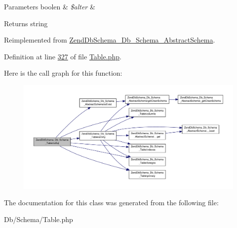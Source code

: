 \begin{DoxyParams}[1]{Parameters}
boolen & {\em \$alter} & \\
\hline
\end{DoxyParams}
\begin{DoxyReturn}{Returns}
string 
\end{DoxyReturn}


Reimplemented from \hyperlink{classZendDbSchema__Db__Schema__AbstractSchema_ada5af8e6e7a4c5407b7ca67d03900b31}{Zend\-Db\-Schema\-\_\-\-Db\-\_\-\-Schema\-\_\-\-Abstract\-Schema}.



Definition at line \hyperlink{Table_8php_source_l00327}{327} of file \hyperlink{Table_8php_source}{Table.\-php}.



Here is the call graph for this function\-:\nopagebreak
\begin{figure}[H]
\begin{center}
\leavevmode
\includegraphics[width=350pt]{classZendDbSchema__Db__Schema__Table_a6178edaeea7e08d97e2196dd991532f9_cgraph}
\end{center}
\end{figure}




The documentation for this class was generated from the following file\-:\begin{DoxyCompactItemize}
\item 
Db/\-Schema/Table.\-php\end{DoxyCompactItemize}
